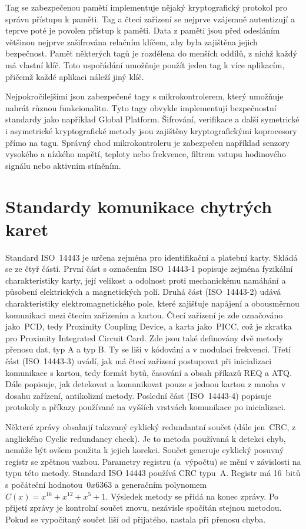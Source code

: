 \par
Tag se zabezpečenou pamětí implementuje nějaký kryptografický protokol pro správu přístupu k paměti. Tag a čtecí zařízení se nejprve vzájemně autentizují a teprve poté je povolen přístup k paměti. Data z paměti jsou před odesláním většinou nejprve zašifrována relačním klíčem, aby byla zajištěna jejich bezpečnost. Paměť některých tagů je rozdělena do menších oddílů, z nichž každý má vlastní klíč. Toto uspořádání umožňuje použít jeden tag k více aplikacím, přičemž každé aplikaci náleží jiný klíč.
\par
Nejpokročilejšími jsou zabezpečené tagy s mikrokontrolerem, který umožňuje nahrát různou funkcionalitu. Tyto tagy obvykle implementují bezpečnostní standardy jako například Global Platform. Šifrování, verifikace a další symetrické i asymetrické kryptografické metody jsou zajištěny kryptografickými koprocesory přímo na tagu\cite{Mifare_Classic_story}. Správný chod mikrokontroleru je zabezpečen například senzory vysokého a nízkého napětí, teploty nebo frekvence, filtrem vstupu hodinového signálu nebo aktivním stíněním\cite{NXP_Microcontroller_overview}.

\section{Standardy komunikace chytrých karet}
Standard ISO~14443 je určena zejména pro identifikační a platební karty. Skládá se ze čtyř částí. První část s označením {ISO~14443-1} popisuje zejména fyzikální charakteristiky karty, její velikost a odolnost proti mechanickému namáhání a působení elektrických a magnetických polí. Druhá část ({ISO~14443-2}) udává charakteristiky elektromagnetického pole, které zajišťuje napájení a obousměrnou komunikaci mezi čtecím zařízením a kartou. Čtecí zařízení je zde označováno jako~PCD, tedy Proximity Coupling Device, a karta jako~PICC, což je zkratka pro Proximity Integrated Circuit Card. Zde jsou také definovány dvě metody přenosu dat, typ A a typ B. Ty se liší v kódování a v modulaci frekvencí. Třetí část ({ISO~14443-3}) uvádí, jak má čtecí zařízení postupovat při inicializaci komunikace s kartou, tedy formát bytů, časování a obsah příkazů REQ a ATQ. Dále popisuje, jak detekovat a komunikovat pouze s jednou kartou z mnoha v dosahu zařízení, antikolizní metody. Poslední část ({ISO~14443-4}) popisuje protokoly a příkazy používané na vyšších vrstvách komunikace po inicializaci\cite{ISO14443}.
\par
Některé zprávy obsahují takzvaný cyklický redundantní součet (dále jen~CRC, z anglického Cyclic redundancy check). Je to metoda používaná k detekci chyb, nemůže být ovšem použita k jejich korekci. Součet generuje cyklický posuvný registr se zpětnou vazbou. Parametry registru (a~výpočtu) se mění v závislosti na typu této metody. Standard ISO 14443 používá CRC typu~A. Registr má 16~bitů s počáteční hodnotou~$0x6363$ a generačním polynomem $C(x) = x^{16} + x^{12} + x^5 + 1$. Výsledek metody se přidá na konec zprávy. Po přijetí zprávy je kontrolní součet znovu, nezávisle spočítán stejnou metodou. Pokud se vypočítaný součet liší od přijatého, nastala při přenosu chyba\cite{Smart_card_handbook}\cite{ISO14443}.


